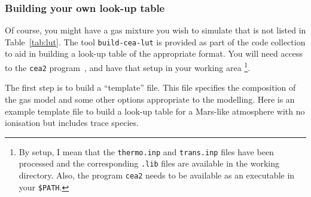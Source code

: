 \subsubsection{Building your own look-up table}
Of course, you might have a gas mixture you wish to simulate that is not listed in Table~\ref{tab:lut}.
The tool \texttt{build-cea-lut} is provided as part of the code collection to aid in building a 
look-up table of the appropriate format.
You will need access to the \texttt{cea2} program~\cite{gordon_mcbride_1994, mcbride_gordon_1996}, and have that setup in your working area
\footnote{By setup, I mean
that the \texttt{thermo.inp} and \texttt{trans.inp} files have been processed and the corresponding \texttt{.lib} files
are available in the working directory.
Also, the program \texttt{cea2} needs to be available as an executable in your \texttt{\$PATH}.}.

The first step is to build a ``template'' file.
This file specifies the composition of the gas model and some other options appropriate to the modelling.
Here is an example template file to build a look-up table for a Mars-like atmosphere with no ionisation but
includes trace species. 

\noindent
\topbar

\bottombar

